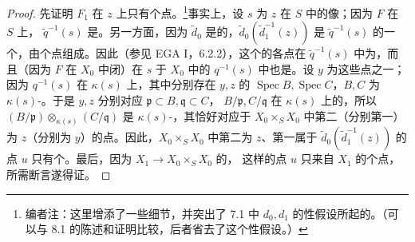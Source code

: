 \begin{proof}
先证明 $F_1$ 在 $z$ 上只有个点。\footnote{编者注：这里增添了一些细节，并突出了 7.1 中 $d_0,d_1$ 的性假设所起的。（可以与 8.1 的陈述和证明比较，后者省去了这个性假设。）}事实上，设 $s$ 为 $z$ 在 $S$ 中的像；因为 $F$ 在 $S$ 上， $\widetilde q^{-1}(s)$ 是。另一方面，因为 $\widetilde d_0$ 是的，$\widetilde d_0(\widetilde d_1^{-1}(z))$ 是 $\widetilde q^{-1}(s)$ 的一个，由个点组成。因此（参见 EGA I，6.2.2），这个的各点在 $\widetilde q^{-1}(s)$ 中为，而且（因为 $F$ 在 $X_0$ 中闭）在 $s$ 于 $X_0$ 中的 $q^{-1}(s)$ 中也是。设 $y$ 为这些点之一；因为 $q^{-1}(s)$ 在 $\kappa(s)$ 上，其中分别存在 $y,z$ 的 $\operatorname{Spec}B,\operatorname{Spec}C$，$B,C$ 为 $\kappa(s)$-。于是 $y,z$ 分别对应 $\mathfrak p\subset B,\mathfrak q\subset C$， $B/\mathfrak p,C/\mathfrak q$ 在 $\kappa(s)$ 上的，所以 $(B/\mathfrak p)\otimes_{\kappa(s)}(C/\mathfrak q)$ 是 $\kappa(s)$-，其恰好对应于 $X_0\times_SX_0$ 中第二（分别第一）为 $z$（分别为 $y$）的点。因此，$X_0\times_SX_0$ 中第二为 $z$、第一属于 $\widetilde d_0(\widetilde d_1^{-1}(z))$ 的点 $u$ 只有个。最后，因为 $X_1\to X_0\times_SX_0$ 的，
这样的点 $u$ 只来自 $X_1$ 的个点，所需断言遂得证。


\end{proof}
